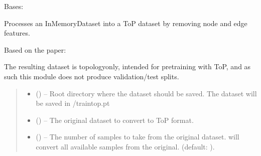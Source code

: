 \documentclass[letterpaper,10pt,english]{sphinxhowto}
\begin{document}
\begin{fulllineitems}
\label{\detokenize{top:top.ToPDataset}}
\pysigstartsignatures
{}
\pysigstopsignatures
\sphinxAtStartPar
Bases: 

\sphinxAtStartPar
Processes an InMemoryDataset into a ToP dataset by removing node and edge features.

\sphinxAtStartPar
Based on the paper:
\begin{quote}

\sphinxAtStartPar
{}
\end{quote}

\sphinxAtStartPar
The resulting dataset is topology\sphinxhyphen{}only, intended for pre\sphinxhyphen{}training with ToP, and as such this module does not produce validation/test splits.
\begin{quote}\begin{description}
\begin{itemize}
\item {} 
\sphinxAtStartPar
{} () – Root directory where the dataset should be saved. The dataset will be saved in /train\sphinxhyphen{}top.pt

\item {} 
\sphinxAtStartPar
{} () – The original dataset to convert to ToP format.

\item {} 
\sphinxAtStartPar
{} () – The number of samples to take from the original dataset.  will convert all available samples from the original. (default: ).


\end{itemize}
\end{description}
\end{quote}
\end{fulllineitems}
\end{document}
